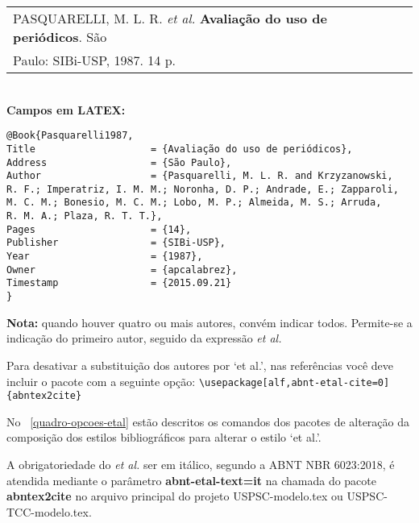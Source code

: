 \begin{tabular}{|l|c|} \hline
PASQUARELLI, M. L. R. \textit{et al.} \textbf{Avaliação do uso de periódicos}. 
São \\ Paulo: SIBi-USP, 1987. 14 p.\\\hline
\end{tabular}\\

\textbf{Campos em LATEX:}

\begin{verbatim}
@Book{Pasquarelli1987,
Title                    = {Avaliação do uso de periódicos},
Address                  = {São Paulo},
Author                   = {Pasquarelli, M. L. R. and Krzyzanowski,
R. F.; Imperatriz, I. M. M.; Noronha, D. P.; Andrade, E.; Zapparoli,
M. C. M.; Bonesio, M. C. M.; Lobo, M. P.; Almeida, M. S.; Arruda, 
R. M. A.; Plaza, R. T. T.},
Pages                    = {14},
Publisher                = {SIBi-USP},
Year                     = {1987},
Owner                    = {apcalabrez},
Timestamp                = {2015.09.21}
}
\end{verbatim}

\textbf{Nota:} quando houver quatro ou mais autores, conv\'em indicar todos. Permite-se a indicação do primeiro autor, seguido da expressão \textit{et al.} 

Para desativar a substituição dos autores por ‘et al.’, nas refer\^encias voc\^e deve incluir o pacote com a seguinte opção: \verb+\usepackage[alf,abnt-etal-cite=0]{abntex2cite}+

No ~\autoref{quadro-opcoes-etal} estão descritos os comandos dos pacotes de alteração da composição dos estilos bibliogr\'aficos para alterar o estilo ‘et al.’.

A obrigatoriedade do \textit{et al.} ser em it\'alico, segundo a ABNT NBR 6023:2018, \'e atendida mediante o par\^ametro \textbf{abnt-etal-text=it} na chamada do pacote \textbf{abntex2cite} no arquivo principal do projeto USPSC-modelo.tex ou USPSC-TCC-modelo.tex. 



